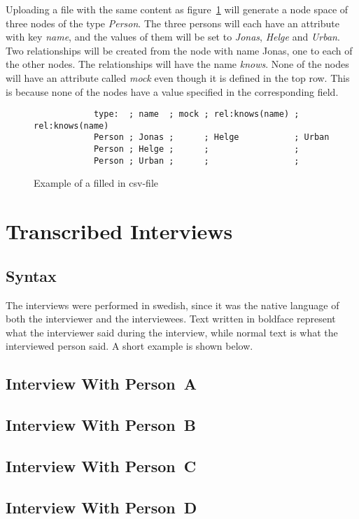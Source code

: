 \documentclass[a4paper]{report}
\begin{document}
Uploading a file with the same content as figure~\ref{fig:csv-example} will generate a node space of three nodes of the type \emph{Person}. The three persons will each have an attribute with key \emph{name}, and the values of them will be set to \emph{Jonas}, \emph{Helge} and \emph{Urban}. Two relationships will be created from the node with name Jonas, one to each of the other nodes. The relationships will have the name \emph{knows}. None of the nodes will have an attribute called \emph{mock} even though it is defined in the top row. This is because none of the nodes have a value specified in the corresponding field.

\begin{figure}[hbtp]
	\center
	\begin{minipage}[h]{0.9\linewidth}
		\begin{verbatim}
			type:  ; name  ; mock ; rel:knows(name) ; rel:knows(name)
			Person ; Jonas ;      ; Helge           ; Urban
			Person ; Helge ;      ;                 ;
			Person ; Urban ;      ;                 ;
		\end{verbatim}
	\end{minipage}
	\caption{Example of a filled in csv-file}
	\label{fig:csv-example}
\end{figure}

\chapter{Transcribed Interviews} \label{app:transcribed-interviews}
\thispagestyle{empty}
\section{Syntax}

The interviews were performed in swedish, since it was the native language of both the interviewer and the interviewees. Text written in boldface represent what the interviewer said during the interview, while normal text is what the interviewed person said. A short example is shown below.

\vspace{1cm}


\section{Interview With Person~A}


\section{Interview With Person~B}


\section{Interview With Person~C}


\section{Interview With Person~D}

\end{document}
